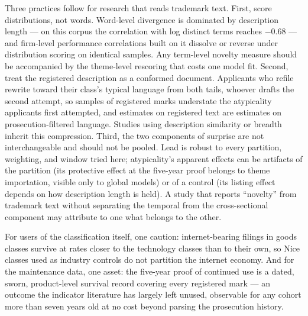 Three practices follow for research that reads trademark text. First,
score distributions, not words. Word-level divergence is dominated by
description length --- on this corpus the correlation with log distinct
terms reaches $-0.68$ --- and firm-level performance correlations built
on it dissolve or reverse under distribution scoring on identical
samples. Any term-level novelty measure should be accompanied by the
theme-level rescoring that costs one model fit. Second, treat the
registered description as a conformed document. Applicants who refile
rewrite toward their class's typical language from both tails, whoever
drafts the second attempt, so samples of registered marks understate the
atypicality applicants first attempted, and estimates on registered text
are estimates on prosecution-filtered language. Studies using description
similarity or breadth inherit this compression. Third, the two components
of surprise are not interchangeable and should not be pooled. Lead is
robust to every partition, weighting, and window tried here;
atypicality's apparent effects can be artifacts of the partition (its
protective effect at the five-year proof belongs to theme importation,
visible only to global models) or of a control (its listing effect
depends on how description length is held). A study that reports
``novelty'' from trademark text without separating the temporal from the
cross-sectional component may attribute to one what belongs to the other.

For users of the classification itself, one caution: internet-bearing
filings in goods classes survive at rates closer to the technology
classes than to their own, so Nice classes used as industry controls do
not partition the internet economy. And for the maintenance data, one
asset: the five-year proof of continued use is a dated, sworn,
product-level survival record covering every registered mark --- an
outcome the indicator literature has largely left unused, observable for
any cohort more than seven years old at no cost beyond parsing the
prosecution history.
